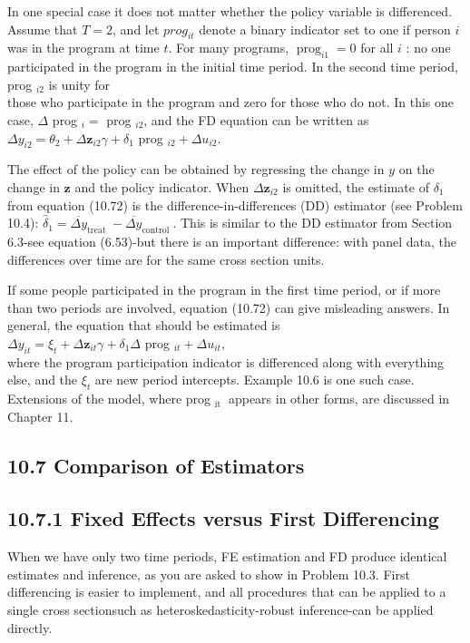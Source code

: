 \documentclass[10pt]{article}
\begin{document}
In one special case it does not matter whether the policy variable is differenced. Assume that $T=2$, and let $p r o g_{i t}$ denote a binary indicator set to one if person $i$ was in the program at time $t$. For many programs, $\operatorname{prog}_{i 1}=0$ for all $i$ : no one participated in the program in the initial time period. In the second time period, prog $_{i 2}$ is unity for\\
those who participate in the program and zero for those who do not. In this one case, $\Delta$ prog $_{i}=$ prog $_{i 2}$, and the FD equation can be written as\\
$\Delta y_{i 2}=\theta_{2}+\Delta \mathbf{z}_{i 2} \gamma+\delta_{1}$ prog $_{i 2}+\Delta u_{i 2}$.

The effect of the policy can be obtained by regressing the change in $y$ on the change in $\mathbf{z}$ and the policy indicator. When $\Delta \mathbf{z}_{i 2}$ is omitted, the estimate of $\delta_{1}$ from equation (10.72) is the difference-in-differences (DD) estimator (see Problem 10.4): $\hat{\delta}_{1}=\overline{\Delta y}_{\text {treat }}-\overline{\Delta y}_{\text {control }}$. This is similar to the DD estimator from Section 6.3-see equation (6.53)-but there is an important difference: with panel data, the differences over time are for the same cross section units.

If some people participated in the program in the first time period, or if more than two periods are involved, equation (10.72) can give misleading answers. In general, the equation that should be estimated is\\
$\Delta y_{i t}=\xi_{t}+\Delta \mathbf{z}_{i t} \gamma+\delta_{1} \Delta$ prog $_{i t}+\Delta u_{i t}$,\\
where the program participation indicator is differenced along with everything else, and the $\xi_{t}$ are new period intercepts. Example 10.6 is one such case. Extensions of the model, where prog $_{\text {it }}$ appears in other forms, are discussed in Chapter 11.

\subsection*{10.7 Comparison of Estimators}
\subsection*{10.7.1 Fixed Effects versus First Differencing}
When we have only two time periods, FE estimation and FD produce identical estimates and inference, as you are asked to show in Problem 10.3. First differencing is easier to implement, and all procedures that can be applied to a single cross sectionsuch as heteroskedasticity-robust inference-can be applied directly.
\end{document}
